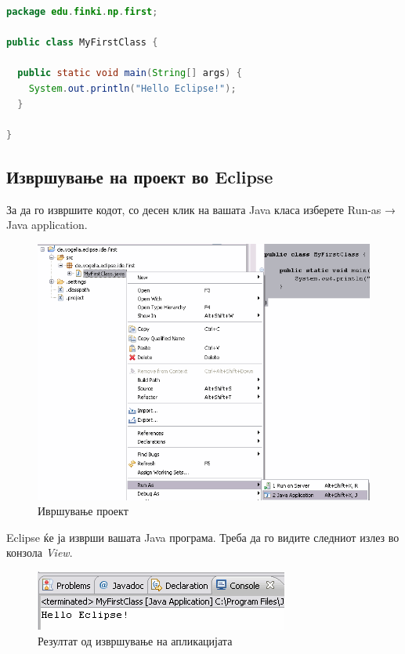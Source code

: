 \begin{lstlisting}[language=Java]
package edu.finki.np.first;

public class MyFirstClass {

  public static void main(String[] args) {
    System.out.println("Hello Eclipse!");
  }

} 
\end{lstlisting}

\subsection{Извршување на проект во Eclipse}

За да го извршите кодот, со десен клик на вашата Java класа изберете Run-as →
Java application.

\begin{figure}
\centering
\includegraphics[scale=.5]{images/run}
\caption{Ивршување проект}
\end{figure}

Eclipse ќе ја изврши вашата Java програма. Треба да го видите следниот излез во
конзола \emph{View}.

\begin{figure}
\centering
\includegraphics[scale=.5]{images/result}
\caption{Резултат од извршување на апликацијата}
\end{figure}

